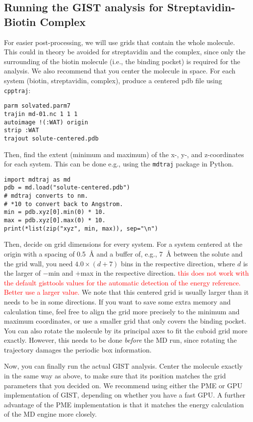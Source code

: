 \documentclass[9pt,tutorial]{livecoms}
\newcommand{\software}{\texttt}
\newcommand{\todo}{\textcolor{red}}
\begin{document}
\subsection{Running the GIST analysis for Streptavidin-Biotin Complex}
For easier post-processing, we will use grids that contain the whole molecule.
This could in theory be avoided for streptavidin and the complex, since only the surrounding of the biotin molecule (i.e., the binding pocket) is required for the analysis.
We also recommend that you center the molecule in space.
For each system (biotin, streptavidin, complex), produce a centered pdb file using \software{cpptraj}:
\begin{lstlisting}
parm solvated.parm7
trajin md-01.nc 1 1 1
autoimage !(:WAT) origin
strip :WAT
trajout solute-centered.pdb
\end{lstlisting}
Then, find the extent (minimum and maximum) of the x-, y-, and z-coordinates for each system.
This can be done e.g., using the \software{mdtraj} package in Python.
\begin{lstlisting}[style=python]
import mdtraj as md
pdb = md.load("solute-centered.pdb")
# mdtraj converts to nm.
# *10 to convert back to Angstrom.
min = pdb.xyz[0].min(0) * 10.
max = pdb.xyz[0].max(0) * 10.
print(*list(zip("xyz", min, max)), sep="\n")
\end{lstlisting}
Then, decide on grid dimensions for every system.
For a system centered at the origin with a spacing of \SI{0.5}{\angstrom} and a buffer of, e.g., \SI{7}{\angstrom} between the solute and the grid wall, you need $4.0\times (d+7)$ bins in the respective direction, where $d$ is the larger of $-$min and $+$max in the respective direction.
\todo{this does not work with the default gisttools values for the automatic detection of the energy reference. Better use a larger value. }
We note that this centered grid is usually larger than it needs to be in some directions.
If you want to save some extra memory and calculation time, feel free to align the grid more precisely to the minimum and maximum coordinates, or use a smaller grid that only covers the binding pocket.
You can also rotate the molecule by its principal axes to fit the cuboid grid more exactly.
However, this needs to be done \emph{before} the MD run, since rotating the trajectory damages the periodic box information.

Now, you can finally run the actual GIST analysis. Center the molecule exactly in the same way as above, to make sure that its position matches the grid parameters that you decided on.
We recommend using either the PME or GPU implementation of GIST, depending on whether you have a fast GPU.
A further advantage of the PME implementation is that it matches the energy calculation of the MD engine more closely.
\end{document}
